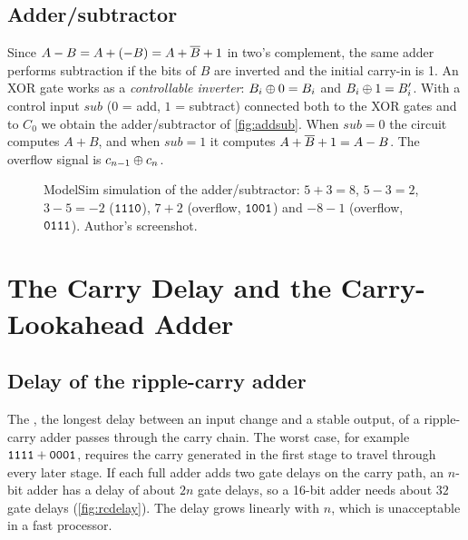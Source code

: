 \subsection{Adder/subtractor}
Since $A-B = A+(-B) = A+\overline{B}+1$ in two's complement, the same adder performs subtraction if the bits of $B$ are inverted and the initial carry-in is 1. An XOR gate works as a \emph{controllable inverter}: $B_i\oplus 0=B_i$ and $B_i\oplus 1=B_i'$. With a control input $\mathit{sub}$ ($0$ = add, $1$ = subtract) connected both to the XOR gates and to $C_0$ we obtain the adder/subtractor of \cref{fig:addsub}. When $\mathit{sub}=0$ the circuit computes $A+B$, and when $\mathit{sub}=1$ it computes $A+\overline{B}+1=A-B$. The overflow signal is $c_{n-1}\oplus c_n$.



\begin{figure}[htbp]
\centering
{}
\caption{ModelSim simulation of the adder/subtractor: $5+3=8$, $5-3=2$, $3-5=-2$ ($\mathtt{1110}$), $7+2$ (overflow, $\mathtt{1001}$) and $-8-1$ (overflow, $\mathtt{0111}$). Author's screenshot.}
\label{fig:sim-as}
\end{figure}

\section{The Carry Delay and the Carry-Lookahead Adder}\label{sec:cla}
\subsection{Delay of the ripple-carry adder}
The , the longest delay between an input change and a stable output, of a ripple-carry adder passes through the carry chain. The worst case, for example $\mathtt{1111}+\mathtt{0001}$, requires the carry generated in the first stage to travel through every later stage. If each full adder adds two gate delays on the carry path, an $n$-bit adder has a delay of about $2n$ gate delays, so a 16-bit adder needs about $32$ gate delays (\cref{fig:rcdelay}). The delay grows linearly with $n$, which is unacceptable in a fast processor.

